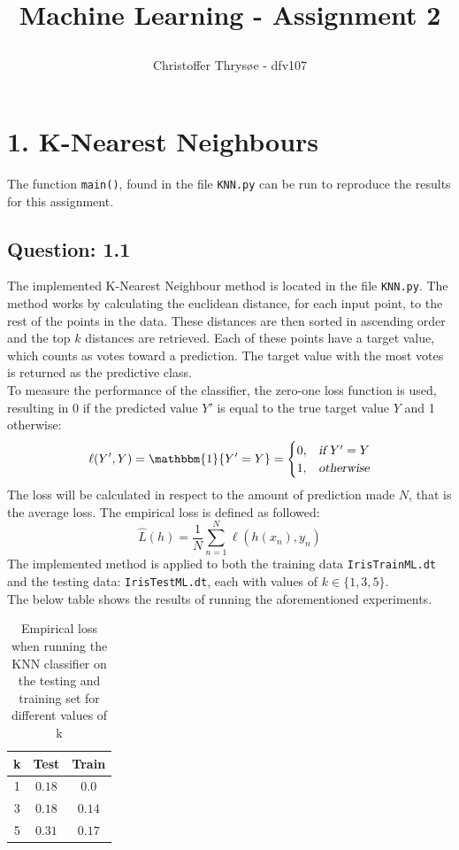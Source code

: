 \documentclass{article}
\title{
\vspace{1in}
\textmd{\textbf{Machine Learning - Assignment 2}} \\
\author{Christoffer Thrysøe - dfv107}
}
\begin{document}
\maketitle
{}
\section{1. K-Nearest Neighbours}
The function \texttt{main()}, found in the file \texttt{KNN.py} can be run to reproduce the results for this assignment.
\subsection{Question: 1.1}
The implemented K-Nearest Neighbour method is located in the file \texttt{KNN.py}. The method works by calculating the euclidean distance, for each input point, to the rest of the points in the data. These distances are then sorted in ascending order and the top $k$ distances are retrieved. Each of these points have a target value, which counts as votes toward a prediction. The target value with the most votes is returned as the predictive class.
\\
To measure the performance of the classifier, the zero-one loss function is used, resulting in 0 if the predicted value $Y'$ is equal to the true target value $Y$ and 1 otherwise:
\begin{equation*}
\begin{split}
\ell(Y',Y) =
\mathbbm{1} \lbrace Y'= Y \rbrace =
\begin{cases}
0,& \textsl{if } Y' = Y  \\
1,&  \textsl{otherwise}
\end{cases}
\end{split}
\label{indikator}
\end{equation*}
The loss will be calculated in respect to the amount of prediction made $N$, that is the average loss. The empirical loss is defined as followed:
\begin{equation*}
\hat{L}(h) =  \dfrac{1}{N}\sum\limits^{N}_{n=1} \ell (h(x_n),y_n)
\end{equation*}
The implemented method is applied to both the training data \texttt{IrisTrainML.dt} and the testing data: \texttt{IrisTestML.dt}, each with values of $k \in \lbrace 1,3,5 \rbrace$.
\\
The below table shows the results of running the aforementioned experiments.
\begin{table}[H]
  \centering
  \label{tab:table1}
  \begin{tabular}{c||c|c}
    \textsf{k} & \textsf{Test} & \textsf{Train} \\
    \hline
    1 & $0.18$ & $0.0$ \\
    3 & $0.18$ & $0.14$ \\    
    5 & $0.31$ & $0.17$\\
  \end{tabular}
  \caption{Empirical loss when running the KNN classifier on the testing and training set for different values of k} 
\end{table}
\end{document}
